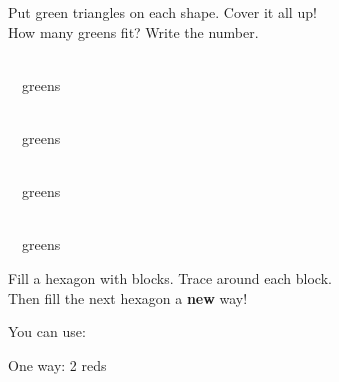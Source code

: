 
\renewcommand{\bandname}{Grades K--1}
\renewcommand{\bandcolor}{pbgreen}

\newcommand{\cell}[3]{%
  \parbox[c][#2][c]{#1}{\centering #3}}

\Large

\nameline
Put green triangles  on each shape. Cover it all up!\\[2pt]
How many greens fit? Write the number.

\vspace{0.25in}
\noindent
\cell{3.7in}{2.4in}{\\[0.25in] ~\ansbox~greens}\hfill
\cell{3.7in}{2.4in}{\\[0.25in] ~\ansbox~greens}

\vspace{0.3in}
\noindent
\cell{3.7in}{3.1in}{\\[0.25in] ~\ansbox~greens}\hfill
\cell{3.7in}{3.1in}{\\[0.25in] \icb{green}~\ansbox~greens}

\vspace{0.3in}
\newpage

Fill a hexagon with blocks. Trace around each block.\\[2pt]
Then fill the next hexagon a \textbf{new} way!

\vspace{0.12in}
\noindent
\begin{minipage}[c]{5.0in}
You can use:\; \; \; \; \; 
\end{minipage}\hfill
\begin{minipage}[c]{2.3in}\raggedleft
\normalsize One way: 2 reds\quad {}
\end{minipage}

\vspace{0.35in}
\noindent
\cell{2.45in}{2.2in}{}\hfill
\cell{2.45in}{2.2in}{}\hfill
\cell{2.45in}{2.2in}{}

\vspace{0.25in}
\noindent
\cell{2.45in}{2.2in}{}\hfill
\cell{2.45in}{2.2in}{}\hfill
\cell{2.45in}{2.2in}{\fig{k1_hex}}

